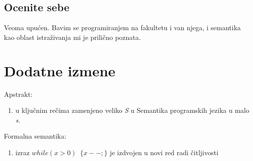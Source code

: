 \documentclass[a4paper]{report}
\begin{document}
\section{Ocenite sebe}
Veoma upućen. Bavim se programiranjem na fakultetu i van njega, i semantika kao oblast istraživanja mi je prilično poznata.


\chapter{Dodatne izmene}
Apstrakt: 
\begin{enumerate}
\item u ključnim rečima zamenjeno veliko \textit{S} u Semantika programskih jezika u malo \textit{s}.
\end{enumerate}
Formalna semantika:
\begin{enumerate}
\item izraz \texttt{$ while(x > 0)$  $\lbrace x--;\rbrace$} je izdvojen u novi red radi čitljivosti
\end{enumerate}
\end{document}
